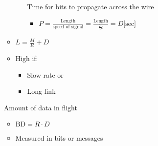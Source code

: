 \begin{itemize}
\begin{itemize}
\begin{itemize}
                     Time for bits to propagate across the wire
                        \begin{itemize}
                            \item $P = \frac{\text{Length}}{\text{speed of signal}} = \frac{\text{Length}}{\frac{2}{3}c} = D \text{[sec]}$
                        \end{itemize}
                \end{itemize}
            \item $L = \frac{M}{R} + D$
            \item High if:
                \begin{itemize}
                    \item Slow rate or
                    \item Long link
                \end{itemize}
        \end{itemize}
     Amount of data in flight
        \begin{itemize}
            \item $\text{BD} = R \cdot D$
            \item Measured in bits or messages
        \end{itemize}
\end{itemize}

